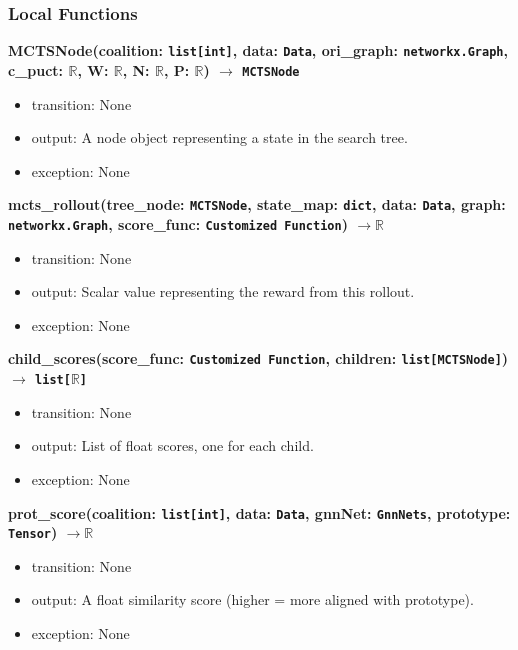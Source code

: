 \documentclass[12pt, titlepage]{article}
\begin{document}
\subsubsection{Local Functions}

\noindent 
\textbf{MCTSNode(coalition: \texttt{list[int]}, data: \texttt{Data}, ori\_graph: \texttt{networkx.Graph}, c\_puct: \(\mathbb{R}\), W: \(\mathbb{R}\), N: \(\mathbb{R}\), P: \(\mathbb{R}\)) \(\rightarrow\) \texttt{MCTSNode}}
\begin{itemize}
  \item transition: None
  \item output: A node object representing a state in the search tree.
  \item exception: None
\end{itemize}

\noindent 
\textbf{mcts\_rollout(tree\_node: \texttt{MCTSNode}, state\_map: \texttt{dict}, data: \texttt{Data}, graph: \texttt{networkx.Graph}, score\_func: \texttt{Customized Function}) \(\rightarrow \mathbb{R}\)}
\begin{itemize}
  \item transition: None
  \item output: Scalar value representing the reward from this rollout.
  \item exception: None
\end{itemize}

\noindent 
\textbf{child\_scores(score\_func: \texttt{Customized Function}, children: \texttt{list[MCTSNode]}) \(\rightarrow\) \texttt{list[\(\mathbb{R}\)]}}
\begin{itemize}
  \item transition: None
  \item output: List of float scores, one for each child.
  \item exception: None
\end{itemize}

\noindent 
\textbf{prot\_score(coalition: \texttt{list[int]}, data: \texttt{Data}, gnnNet: \texttt{GnnNets}, prototype: \texttt{Tensor}) \(\rightarrow \mathbb{R}\)}
\begin{itemize}
  \item transition: None
  \item output: A float similarity score (higher = more aligned with prototype).
  \item exception: None
\end{itemize}
\end{document}

